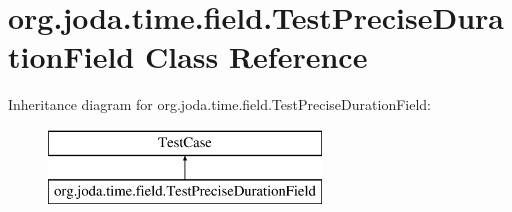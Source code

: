 \hypertarget{classorg_1_1joda_1_1time_1_1field_1_1_test_precise_duration_field}{\section{org.\-joda.\-time.\-field.\-Test\-Precise\-Duration\-Field Class Reference}
\label{classorg_1_1joda_1_1time_1_1field_1_1_test_precise_duration_field}
}
Inheritance diagram for org.\-joda.\-time.\-field.\-Test\-Precise\-Duration\-Field\-:\begin{figure}[H]
\begin{center}
\leavevmode
\includegraphics[height=2.000000cm]{classorg_1_1joda_1_1time_1_1field_1_1_test_precise_duration_field}
\end{center}
\end{figure}
